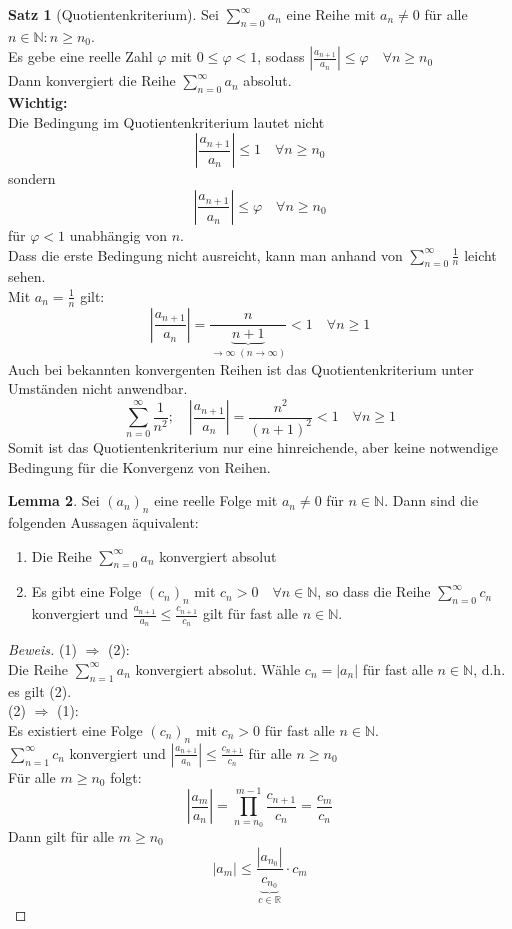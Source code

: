 \documentclass[12pt,a4paper,titlepage]{article} %
\theoremstyle{definition}
\newtheorem{satz}{Satz}[subsection]
\newtheorem{lem}[satz]{Lemma}
\theoremstyle{remark}
\newenvironment{bew}{\begin{proof}[Beweis]}{\end{proof}}
\newcommand{\N}{\mathbb{N}}
\newcommand{\R}{\mathbb{R}}
\begin{document}
	\begin{satz}[Quotientenkriterium]
		Sei \(\sum_{n=0}^{\infty} a_n\) eine Reihe mit \(a_n \neq 0\) für alle \(n \in \N: n \geq n_0\).\\
		Es gebe eine reelle Zahl \(\varphi\) mit \(0 \leq \varphi < 1\), sodass \(\left|\frac{a_{n+1}}{a_n}\right| \leq \varphi \quad \forall n \geq n_0\)\\
		Dann konvergiert die Reihe \(\sum_{n=0}^{\infty} a_n\) absolut.\\
		\textbf{Wichtig:}\\
		Die Bedingung im Quotientenkriterium lautet nicht 
		\[\left|\frac{a_{n+1}}{a_n}\right| \leq 1 \quad \forall n \geq n_0\]
		sondern
		\[\left|\frac{a_{n+1}}{a_n}\right| \leq \varphi \quad \forall n \geq n_0\]
		für \(\varphi < 1\) unabhängig von \(n\).\\
		Dass die erste Bedingung nicht ausreicht, kann man anhand von \(\sum_{n=0}^{\infty} \frac{1}{n}\) leicht sehen.\\
		Mit \(a_n = \frac{1}{n}\) gilt: 
		\[\left|\frac{a_{n+1}}{a_n}\right| = \frac{n}{\underbrace{n+1}_{\rightarrow \infty \; (n \rightarrow \infty)}} < 1 \quad \forall n \geq 1\]
		Auch bei bekannten konvergenten Reihen ist das Quotientenkriterium unter Umständen nicht anwendbar.
		\[\sum_{n=0}^{\infty} \frac{1}{n^2}; \quad \left|\frac{a_{n+1}}{a_n}\right| = \frac{n^2}{(n+1)^2} < 1 \quad \forall n \geq 1\]
		Somit ist das Quotientenkriterium nur eine hinreichende, aber keine notwendige Bedingung für die Konvergenz von Reihen.
	\end{satz}
	\begin{lem}
		Sei \((a_n)_n\) eine reelle Folge mit \(a_n \neq 0\) für \(n \in \N\). Dann sind die folgenden Aussagen äquivalent:
		\begin{enumerate}
			\item 
				Die Reihe \(\sum_{n=0}^{\infty} a_n\) konvergiert absolut
			\item
				Es gibt eine Folge \((c_n)_n\) mit \(c_n > 0 \quad \forall n \in \N\), so dass die Reihe \(\sum_{n=0}^{\infty} c_n\) konvergiert und	\(\frac{a_{n+1}}{a_n} \leq \frac{c_{n+1}}{c_n}\) gilt für fast alle \(n \in \N\).
		\end{enumerate}
	\end{lem}
	\begin{bew}
		(1) \(\Rightarrow\) (2):\\
		Die Reihe \(\sum_{n=1}^{\infty} a_n\) konvergiert absolut. Wähle \(c_n = |a_n|\) für fast alle \(n \in \N\), d.h. es gilt (2).\\
		(2) \(\Rightarrow\) (1):\\
		Es existiert eine Folge \((c_n)_n\) mit \(c_n > 0\) für fast alle \(n \in \N\).\\
		\(\sum_{n=1}^{\infty} c_n\) konvergiert und \(\left|\frac{a_{n+1}}{a_n}\right| \leq \frac{c_{n+1}}{c_n}\) für alle \(n \geq n_0\)\\
		Für alle \(m \geq n_0\) folgt:
		\[\left|\frac{a_{m}}{a_n}\right| = \prod_{n=n_0}^{m-1} \frac{c_{n+1}}{c_n} = \frac{c_{m}}{c_n}\]
		Dann gilt für alle \(m \geq n_0\)
		\[|a_m| \leq \frac{|a_{n_0}|}{\underbrace{c_{n_0}}_{c \in \R}} \cdot c_m \]
	\end{bew}
\end{document}
